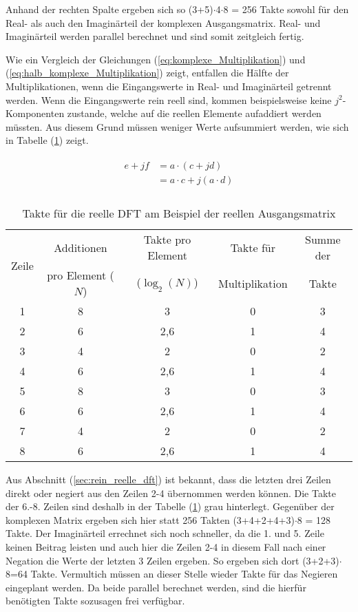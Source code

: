 Anhand der rechten Spalte ergeben sich so (3+5)$\cdot$4$\cdot$8 = 256 Takte sowohl für den Real- als auch den Imaginärteil der komplexen Ausgangsmatrix. Real- und Imaginärteil
werden parallel berechnet und sind somit zeitgleich fertig.

Wie ein Vergleich der Gleichungen (\ref{eq:komplexe_Multiplikation}) und (\ref{eq:halb_komplexe_Multiplikation}) zeigt, entfallen die Hälfte der Multiplikationen, wenn die
Eingangswerte in Real- und Imaginärteil getrennt werden.
Wenn die Eingangswerte rein reell sind, kommen beispielsweise keine $j^2$-Komponenten zustande, welche auf die reellen Elemente aufaddiert werden müssten.
Aus diesem Grund müssen weniger Werte aufsummiert werden, wie sich in Tabelle (\ref{tab:TakteReelleDFT}) zeigt.

\begin{align}\label{eq:halb_komplexe_Multiplikation}
\begin{split}
 e + jf &= a \cdot (c + jd)\\
        &= a \cdot c + j(a \cdot d)\\
\end{split}
\end{align}

\begin{table}[htbp]
\centering
\caption{Takte für die reelle DFT am Beispiel der reellen Ausgangsmatrix}
\label{tab:TakteReelleDFT}
\begin{tabular}{ccccc}
\hline
\multirow{2}{*}{Zeile} & Additionen & Takte pro Element & Takte für & Summe der\\
      & pro Element ($N$) & ($\log_2(N)$) & Multiplikation & Takte\\
\hline
 1& 8 & 3   &0 &3\\
 2& 6 & 2,6 &1 &4\\
 3& 4 & 2   &0 &2\\
 4& 6 & 2,6 &1 &4\\
 5& 8 & 3   &0 &3\\
 \rowcolor{lightgray} 6& 6 & 2,6 &1 &4\\
 \rowcolor{lightgray} 7& 4 & 2   &0 &2\\
 \rowcolor{lightgray} 8& 6 & 2,6 &1 &4\\
\hline
\end{tabular}
\end{table}

Aus Abschnitt (\ref{sec:rein_reelle_dft}) ist bekannt, dass die letzten drei Zeilen direkt oder negiert aus den Zeilen 2-4 übernommen werden können. Die Takte der 6.-8. Zeilen
sind deshalb in der Tabelle (\ref{tab:TakteReelleDFT}) grau hinterlegt. Gegenüber der komplexen Matrix ergeben sich hier statt 256 Takten (3+4+2+4+3)$\cdot$8 = 128 Takte. 
Der Imaginärteil errechnet 
sich noch schneller, da die 1. und 5. Zeile keinen Beitrag leisten und auch hier die Zeilen 2-4 in diesem Fall nach einer Negation die Werte der letzten 3 Zeilen ergeben. 
So ergeben sich dort (3+2+3)$\cdot$8=64 Takte. Vermultich müssen an dieser Stelle wieder Takte für das Negieren eingeplant werden. Da beide parallel berechnet werden, sind die 
hierfür benötigten Takte sozusagen frei verfügbar.

